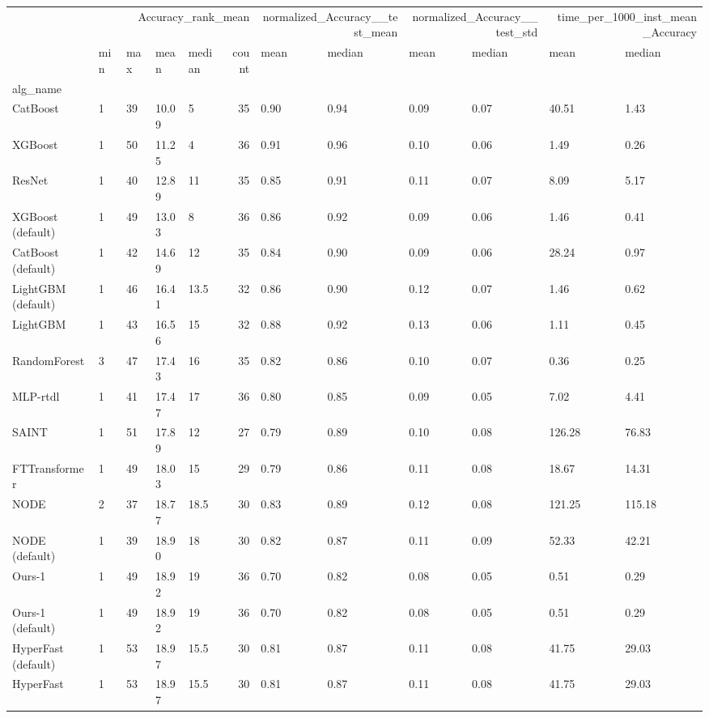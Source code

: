 \begin{tabular}{lllllrllllll}
\toprule
 & \multicolumn{5}{r}{Accuracy_rank_mean} & \multicolumn{2}{r}{normalized_Accuracy__test_mean} & \multicolumn{2}{r}{normalized_Accuracy__test_std} & \multicolumn{2}{r}{time_per_1000_inst_mean_Accuracy} \\
 & min & max & mean & median & count & mean & median & mean & median & mean & median \\
alg_name &  &  &  &  &  &  &  &  &  &  &  \\
\midrule
CatBoost & 1 & 39 & 10.09 & 5 & 35 & 0.90 & 0.94 & 0.09 & 0.07 & 40.51 & 1.43 \\
XGBoost & 1 & 50 & 11.25 & 4 & 36 & 0.91 & 0.96 & 0.10 & 0.06 & 1.49 & 0.26 \\
ResNet & 1 & 40 & 12.89 & 11 & 35 & 0.85 & 0.91 & 0.11 & 0.07 & 8.09 & 5.17 \\
XGBoost (default) & 1 & 49 & 13.03 & 8 & 36 & 0.86 & 0.92 & 0.09 & 0.06 & 1.46 & 0.41 \\
CatBoost (default) & 1 & 42 & 14.69 & 12 & 35 & 0.84 & 0.90 & 0.09 & 0.06 & 28.24 & 0.97 \\
LightGBM (default) & 1 & 46 & 16.41 & 13.5 & 32 & 0.86 & 0.90 & 0.12 & 0.07 & 1.46 & 0.62 \\
LightGBM & 1 & 43 & 16.56 & 15 & 32 & 0.88 & 0.92 & 0.13 & 0.06 & 1.11 & 0.45 \\
RandomForest & 3 & 47 & 17.43 & 16 & 35 & 0.82 & 0.86 & 0.10 & 0.07 & 0.36 & 0.25 \\
MLP-rtdl & 1 & 41 & 17.47 & 17 & 36 & 0.80 & 0.85 & 0.09 & 0.05 & 7.02 & 4.41 \\
SAINT & 1 & 51 & 17.89 & 12 & 27 & 0.79 & 0.89 & 0.10 & 0.08 & 126.28 & 76.83 \\
FTTransformer & 1 & 49 & 18.03 & 15 & 29 & 0.79 & 0.86 & 0.11 & 0.08 & 18.67 & 14.31 \\
NODE & 2 & 37 & 18.77 & 18.5 & 30 & 0.83 & 0.89 & 0.12 & 0.08 & 121.25 & 115.18 \\
NODE (default) & 1 & 39 & 18.90 & 18 & 30 & 0.82 & 0.87 & 0.11 & 0.09 & 52.33 & 42.21 \\
Ours-1 & 1 & 49 & 18.92 & 19 & 36 & 0.70 & 0.82 & 0.08 & 0.05 & 0.51 & 0.29 \\
Ours-1 (default) & 1 & 49 & 18.92 & 19 & 36 & 0.70 & 0.82 & 0.08 & 0.05 & 0.51 & 0.29 \\
HyperFast (default) & 1 & 53 & 18.97 & 15.5 & 30 & 0.81 & 0.87 & 0.11 & 0.08 & 41.75 & 29.03 \\
HyperFast & 1 & 53 & 18.97 & 15.5 & 30 & 0.81 & 0.87 & 0.11 & 0.08 & 41.75 & 29.03 \\

\end{tabular}
